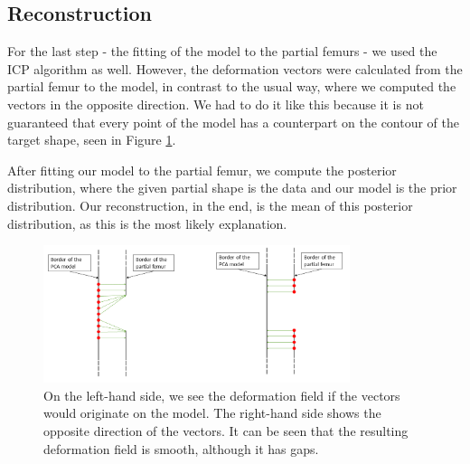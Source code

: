 \documentclass{article} %
\begin{document}
\subsection{Reconstruction}
For the last step - the fitting of the model to the partial femurs - we used the ICP algorithm as well. However, the deformation vectors were calculated from the partial femur to the model, in contrast to the usual way, where we computed the vectors in the opposite direction. We had to do it like this because it is not guaranteed that every point of the model has a counterpart on the contour of the target shape, seen in Figure \ref{fig:reconstruction}.\par
After fitting our model to the partial femur, we compute the posterior distribution, where the given partial shape is the data and our model is the prior distribution. Our reconstruction, in the end, is the mean of this posterior distribution, as this is the most likely explanation.
\begin{figure}[H]
	\centering
	\includegraphics[width=0.8\textwidth]{img/reconstruction_ICP_cut.png}
	\caption{On the left-hand side, we see the deformation field if the vectors would originate on the model. The right-hand side shows the opposite direction of the vectors. It can be seen that the resulting deformation field is smooth, although it has gaps.}
	\label{fig:reconstruction}
\end{figure}
\end{document}
